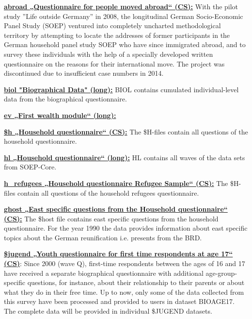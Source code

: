 \documentclass[letterpaper,10pt,openany,onesideH,english]{sphinxmanual}
\begin{document}
 \href{https://paneldata.org/soep-core/data/abroad}{\textbf{abroad „Questionnaire for people moved abroad“ (CS):}} With the pilot study ”Life outside Germany” in 2008, the longitudinal German Socio-Economic Panel Study (SOEP) ventured into completely uncharted methodological territory by attempting to locate the addresses of former participants in the German household panel study SOEP who have since immigrated abroad, and to survey these individuals with the help of a specially developed written questionnaire on the reasons for their international move. The project was discontinued due to insufficient case numbers in 2014.

 \href{https://paneldata.org/soep-long/data/biol}{\textbf{biol "Biographical Data" (long):}} BIOL contains cumulated individual-level data from the biographical questionnaire.

 \href{https://paneldata.org/soep-core/data/ev}{\textbf{ev „First wealth module“ (long):}}

 \href{https://paneldata.org/soep-core/data/bgh}{\textbf{\$h „Household questionnaire“ (CS):}} The \$H-files contain  all questions of the household questionnaire.

 \href{https://paneldata.org/soep-long/data/hl}{\textbf{hl „Household questionnaire“ (long):}} HL contains all waves of the data sets  from SOEP-Core.

 \href{https://paneldata.org/soep-core/data/bgh_refugees}{\textbf{h\_refugees „Household questionnaire Refugee Sample“ (CS):}} The \$H-files contain  all questions of the household refugees questionnaire.

 \href{https://paneldata.org/soep-core/data/ghost}{\textbf{ghost „East specific questions from the Household questionnaire“ (CS):}} The \$host file contains east specific questions from the household questionnaire. For the year 1990 the data provides information about east specific topics about the German reunification i.e. presents from the BRD.

 \href{https://paneldata.org/soep-core/data/bgjugend}{\textbf{\$jugend „Youth questionnaire for first time respondents at age 17“ (CS)}}: Since 2000 (wave Q), first-time respondents between the ages of 16 and 17 have received a separate biographical questionnaire with additional age-group-specific questions, for instance, about their relationship to their parents or about what they do in their free time. Up to now, only some of the data collected from this survey have been processed and provided to users in dataset BIOAGE17. The complete data will be provided in individual \$JUGEND datasets.
\end{document}
